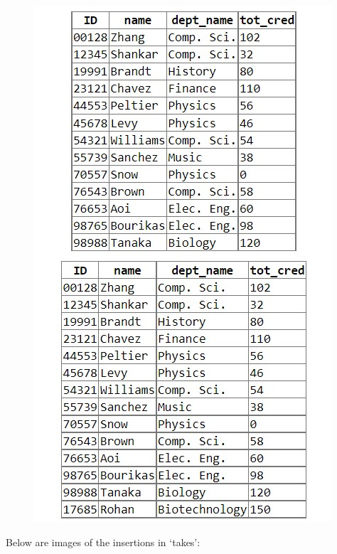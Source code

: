 \documentclass{article}
\begin{document}
\begin{figure}[!hbt]
    \centering
    \includegraphics[scale=0.82]{pics/insert-pic7.jpg}
    \label{fig:ins7}
\end{figure} \newpage \noindent
Below are images of the insertions in `takes':
\end{document}
